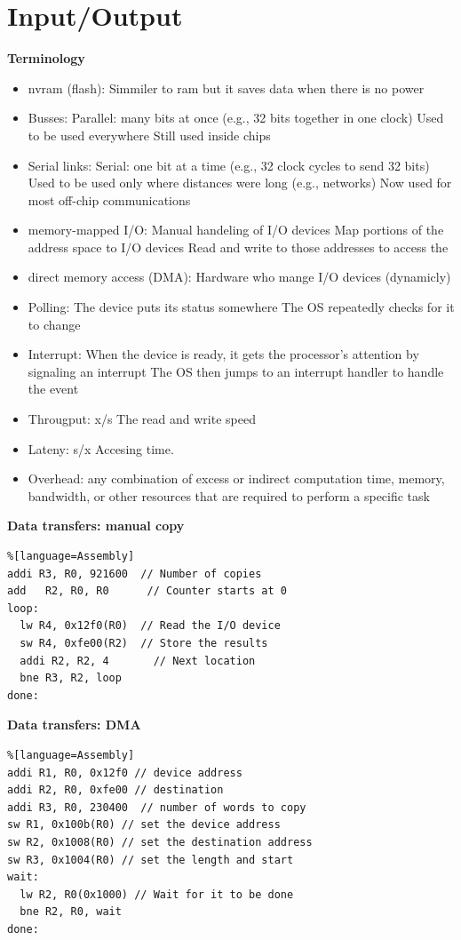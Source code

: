 \newpage


\section{Input/Output}

\textbf{Terminology}
\begin{itemize}
\item  nvram (flash): Simmiler to ram but it saves data when there is no power
\item  Busses:
  Parallel: many bits at once (e.g., 32 bits together in one clock)
  Used to be used everywhere
  Still used inside chips
\item  Serial links:
  Serial: one bit at a time (e.g., 32 clock cycles to send 32 bits)
  Used to be used only where distances were long (e.g., networks)
  Now used for most off-chip communications
\item  memory-mapped I/O:
  Manual handeling of I/O devices
  Map portions of the address space to I/O devices
  Read and write to those addresses to access the 
\item  direct memory access (DMA):
  Hardware who mange I/O devices (dynamicly)
\item  Polling:
  The device puts its status somewhere
  The OS repeatedly checks for it to change
\item  Interrupt:
  When the device is ready, it gets the processor’s attention by signaling an interrupt
  The OS then jumps to an interrupt handler to handle the event
\item  Througput: x/s
  The read and write speed
\item  Lateny: s/x
  Accesing time.
\item  Overhead:
  any combination of excess or 
  indirect computation time, memory, bandwidth,
  or other resources that are required to perform a specific task
\end{itemize}


\newpage

\textbf{Data transfers: manual copy}
\begin{lstlisting}%[language=Assembly]
addi R3, R0, 921600  // Number of copies
add   R2, R0, R0      // Counter starts at 0
loop:
  lw R4, 0x12f0(R0)  // Read the I/O device
  sw R4, 0xfe00(R2)  // Store the results
  addi R2, R2, 4       // Next location
  bne R3, R2, loop
done:
\end{lstlisting}


\textbf{Data transfers: DMA}
\begin{lstlisting}%[language=Assembly]
addi R1, R0, 0x12f0 // device address
addi R2, R0, 0xfe00 // destination
addi R3, R0, 230400  // number of words to copy
sw R1, 0x100b(R0) // set the device address
sw R2, 0x1008(R0) // set the destination address
sw R3, 0x1004(R0) // set the length and start
wait:
  lw R2, R0(0x1000) // Wait for it to be done
  bne R2, R0, wait
done:
\end{lstlisting}


